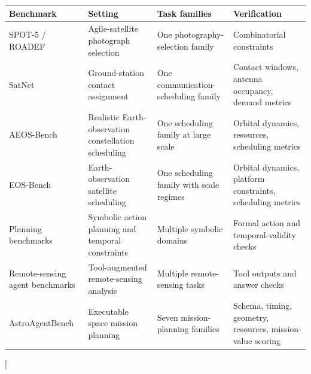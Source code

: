 \documentclass[11pt]{article}
\begin{document}
\begin{center}
\small
\setlength{\tabcolsep}{3.4pt}
\renewcommand{\arraystretch}{1.08}
\begin{tabular}{>{\raggedright\arraybackslash}p{}>{\raggedright\arraybackslash}p{}>{\raggedright\arraybackslash}p{}>{\raggedright\arraybackslash}p{}}
\hline
\rowcolor{headerrow}
\textbf{Benchmark} & \textbf{Setting} & \textbf{Task families} & \textbf{Verification} \\
\hline
\rowcolor{solverrow}
SPOT-5 / ROADEF \citep{lemaitrea2002selecting} & Agile-satellite photograph selection & One photography-selection family & Combinatorial constraints \\
\rowcolor{solverrow}
SatNet \citep{goh2022satnet} & Ground-station contact assignment & One communication-scheduling family & Contact windows, antenna occupancy, demand metrics \\
\rowcolor{solverrow}
AEOS-Bench \citep{wang2026towards} & Realistic Earth-observation constellation scheduling & One scheduling family at large scale & Orbital dynamics, resources, scheduling metrics \\
\rowcolor{solverrow}
EOS-Bench \citep{yin2026eosbench} & Earth-observation satellite scheduling & One scheduling family with scale regimes & Orbital dynamics, platform constraints, scheduling metrics \\
\hline
\rowcolor{agentrow}
Planning benchmarks \citep{valmeekam2023planning,valmeekam2023planbench,ding2025tcp} & Symbolic action planning and temporal constraints & Multiple symbolic domains & Formal action and temporal-validity checks \\
\rowcolor{agentrow}
Remote-sensing agent benchmarks \citep{shabbir2025thinkgeo} & Tool-augmented remote-sensing analysis & Multiple remote-sensing tasks & Tool outputs and answer checks \\
\rowcolor{agentrow}
AstroAgentBench & Executable space mission planning & Seven mission-planning families & Schema, timing, geometry, resources, mission-value scoring \\
\hline
\end{tabular}
\label{tab:benchmark-landscape}
\end{center}
\vspace{0.75\baselineskip}
]
\end{document}
